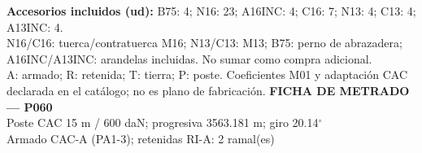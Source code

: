 \begingroup\scriptsize
\textbf{Accesorios incluidos (ud):} B75: 4; N16: 23; A16INC: 4; C16: 7; N13: 4; C13: 4; A13INC: 4.\\
N16/C16: tuerca/contratuerca M16; N13/C13: M13; B75: perno de abrazadera; A16INC/A13INC: arandelas incluidas. No sumar como compra adicional.\\
A: armado; R: retenida; T: tierra; P: poste. Coeficientes M01 y adaptación CAC declarada en el catálogo; no es plano de fabricación.
\endgroup\endgroup
\clearpage{}
\begingroup\small\setlength{\parskip}{3pt}\renewcommand{\arraystretch}{1.05}
\textbf{\large FICHA DE METRADO — P060}\\[4pt]
Poste CAC 15 m / 600 daN; progresiva 3563.181 m; giro 20.14\ensuremath{^\circ}\\
Armado CAC-A (PA1-3); retenidas RI-A: 2 ramal(es)\\
\begingroup\scriptsize
